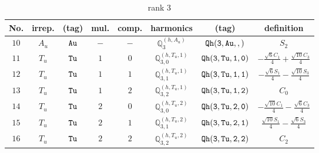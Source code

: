 \documentclass[fleqn,8pt]{jsarticle}
\begin{document}
\begin{table}[ht!]
\begin{center}
\caption{rank 3}
\renewcommand{\arraystretch}{1.3}
\begin{tabular}{cccccccc} \hline \hline
No. & irrep. & (tag) & mul. & comp. & harmonics & (tag) & definition \\ \hline
$ 10 $ & $ A_{u} $ & $ {\tt Au} $ & $ - $ & $ - $ & $ \mathbb{Q}_{3}^{(h,A_{u})} $ & $ {\tt Qh(3,Au,,)} $ & $ S_{2} $ \\
$ 11 $ & $ T_{u} $ & $ {\tt Tu} $ & $ 1 $ & $ 0 $ & $ \mathbb{Q}_{3,0}^{(h,T_{u},1)} $ & $ {\tt Qh(3,Tu,1,0)} $ & $ - \frac{\sqrt{6} C_{1}}{4} + \frac{\sqrt{10} C_{3}}{4} $ \\
$ 12 $ & $ T_{u} $ & $ {\tt Tu} $ & $ 1 $ & $ 1 $ & $ \mathbb{Q}_{3,1}^{(h,T_{u},1)} $ & $ {\tt Qh(3,Tu,1,1)} $ & $ - \frac{\sqrt{6} S_{1}}{4} - \frac{\sqrt{10} S_{3}}{4} $ \\
$ 13 $ & $ T_{u} $ & $ {\tt Tu} $ & $ 1 $ & $ 2 $ & $ \mathbb{Q}_{3,2}^{(h,T_{u},1)} $ & $ {\tt Qh(3,Tu,1,2)} $ & $ C_{0} $ \\
$ 14 $ & $ T_{u} $ & $ {\tt Tu} $ & $ 2 $ & $ 0 $ & $ \mathbb{Q}_{3,0}^{(h,T_{u},2)} $ & $ {\tt Qh(3,Tu,2,0)} $ & $ - \frac{\sqrt{10} C_{1}}{4} - \frac{\sqrt{6} C_{3}}{4} $ \\
$ 15 $ & $ T_{u} $ & $ {\tt Tu} $ & $ 2 $ & $ 1 $ & $ \mathbb{Q}_{3,1}^{(h,T_{u},2)} $ & $ {\tt Qh(3,Tu,2,1)} $ & $ \frac{\sqrt{10} S_{1}}{4} - \frac{\sqrt{6} S_{3}}{4} $ \\
$ 16 $ & $ T_{u} $ & $ {\tt Tu} $ & $ 2 $ & $ 2 $ & $ \mathbb{Q}_{3,2}^{(h,T_{u},2)} $ & $ {\tt Qh(3,Tu,2,2)} $ & $ C_{2} $ \\
 \hline \hline
\end{tabular}
\end{center}
\end{table}
\end{document}
